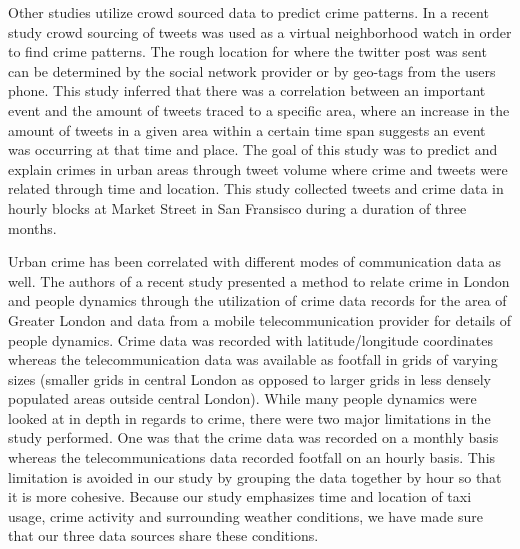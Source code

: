 \documentclass{sigkddExp}
\begin{document}
Other studies utilize crowd sourced data to predict crime patterns. In a recent study \cite{Bendler14}crowd sourcing of tweets was used as a virtual neighborhood watch in order to find crime patterns. The rough location for where the twitter post was sent can be determined by the social network provider or by geo-tags from the users phone. This study inferred that there was a correlation between an important event and the amount of tweets traced to a specific area, where an increase in the amount of tweets in a given area within a certain time span suggests an event was occurring at that time and place. The goal of this study was to predict and explain crimes in urban areas through tweet volume where crime and tweets were related through time and location. This study collected tweets and crime data in hourly blocks at Market Street in San Fransisco during a duration of three months. 

Urban crime has been correlated with different modes of communication data as well. The authors of a recent study \cite{Traunmueller14} presented a method to relate crime in London and people dynamics through the utilization of crime data records for the area of Greater London and data from a mobile telecommunication provider for details of people dynamics. Crime data was recorded with latitude/longitude coordinates whereas the telecommunication data was available as footfall in grids of varying sizes (smaller grids in central London as opposed to larger grids in less densely populated areas outside central London). While many people dynamics were looked at in depth in regards to crime, there were two major limitations in the study performed. One was that the crime data was recorded on a monthly basis whereas the telecommunications data recorded footfall on an hourly basis. This limitation is avoided in our study by grouping the data together by hour so that it is more cohesive. Because our study emphasizes time and location of taxi usage, crime activity and surrounding weather conditions, we have made sure that our three data sources share these conditions.
\end{document}
